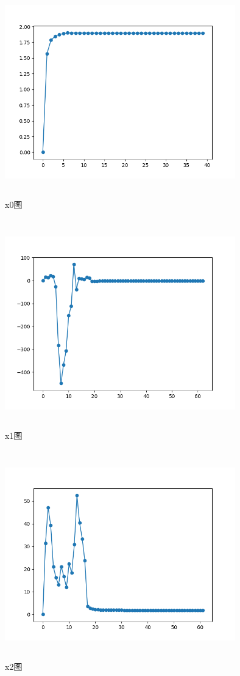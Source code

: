 \documentclass[UTF8]{ctexart}
\begin{document}
\begin{figure}[H]
 \centering
  \includegraphics[width=10cm,height=9cm]{2-3-0.png}
  \caption{x0图}
\end{figure}


\begin{figure}[H]
 \centering
  \includegraphics[width=10cm,height=9cm]{2-3-1.png}
  \caption{x1图}
\end{figure}

\begin{figure}[H]
 \centering
  \includegraphics[width=10cm,height=9cm]{2-3-2.png}
  \caption{x2图}
\end{figure}
\end{document}
